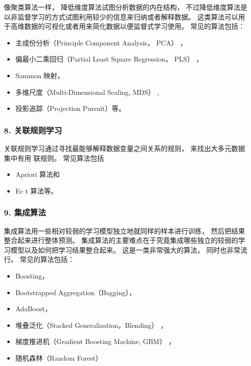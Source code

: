 \documentclass[
]{article}
\begin{document}
像聚类算法一样， 降低维度算法试图分析数据的内在结构，
不过降低维度算法是以非监督学习的方式试图利用较少的信息来归纳或者解释数据。
这类算法可以用于高维数据的可视化或者用来简化数据以便监督式学习使用。
常见的算法包括：

\begin{itemize}
\item
  主成份分析（Principle Component Analysis， PCA） ，
\item
  偏最小二乘回归（Partial Least Square Regression， PLS） ，
\item
  Sammon 映射，
\item
  多维尺度（Multi-Dimensional Scaling, MDS） ,
\item
  投影追踪（Projection Pursuit）等。
\end{itemize}

\hypertarget{8-ux5173ux8054ux89c4ux5219ux5b66ux4e60}{%
\subsubsection{8.
关联规则学习}\label{8-ux5173ux8054ux89c4ux5219ux5b66ux4e60}}

关联规则学习通过寻找最能够解释数据变量之间关系的规则，
来找出大多元数据集中有用 联规则。 常见算法包括

\begin{itemize}
\item
  Apriori 算法和
\item
  Ec t 算法等。
\end{itemize}

\hypertarget{9-ux96c6ux6210ux7b97ux6cd5}{%
\subsubsection{9. 集成算法}\label{9-ux96c6ux6210ux7b97ux6cd5}}

集成算法用一些相对较弱的学习模型独立地就同样的样本进行训练，
然后把结果整合起来进行整体预测。
集成算法的主要难点在于究竟集成哪些独立的较弱的学习模型以及如何把学习结果整合起来。
这是一类非常强大的算法， 同时也非常流行。 常见的算法包括：

\begin{itemize}
\item
  Boosting，
\item
  Bootstrapped Aggregation（Bagging），
\item
  AdaBoost，
\item
  堆叠泛化（Stacked Generalization，Blending） ，
\item
  梯度推进机（Gradient Boosting Machine, GBM） ，
\item
  随机森林（Random Forest）
\end{itemize}
\end{document}
